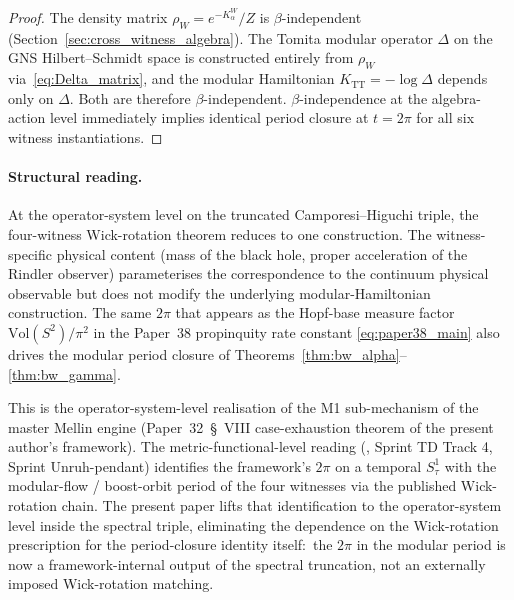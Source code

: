 \documentclass[11pt,a4paper]{article}
\theoremstyle{plain}
\theoremstyle{definition}
\newcommand{\Vol}{\mathrm{Vol}}
\newcommand{\TT}{\mathrm{TT}}
\begin{document}
\begin{proof}
The density matrix $\rho_W = e^{-K_\alpha^W}/Z$ is
$\beta$-independent (Section~\ref{sec:cross_witness_algebra}). The
Tomita modular operator $\Delta$ on the GNS Hilbert--Schmidt space is
constructed entirely from $\rho_W$ via~\eqref{eq:Delta_matrix},
and the modular Hamiltonian $K_{\TT} = -\log \Delta$ depends only on
$\Delta$. Both are therefore $\beta$-independent.
$\beta$-independence at the algebra-action level immediately implies
identical period closure at $t = 2\pi$ for all six witness
instantiations.
\end{proof}

\paragraph{Structural reading.}
At the operator-system level on the truncated Camporesi--Higuchi
triple, the four-witness Wick-rotation theorem reduces to one
construction. The witness-specific physical content (mass of the black
hole, proper acceleration of the Rindler observer) parameterises the
correspondence to the continuum physical observable but does not
modify the underlying modular-Hamiltonian construction. The same
$2\pi$ that appears as the Hopf-base measure factor $\Vol(S^2)/\pi^2$
in the Paper~38 propinquity rate constant
\eqref{eq:paper38_main} also drives the modular period closure of
Theorems~\ref{thm:bw_alpha}--\ref{thm:bw_gamma}.

This is the operator-system-level realisation of the M1 sub-mechanism
of the master Mellin engine
(Paper~32~\S~VIII case-exhaustion theorem of the present author's
framework). The metric-functional-level reading
(\cite[Rem.~rem:bisognano\_wichmann\_reading]{paper32}, Sprint TD
Track 4, Sprint Unruh-pendant) identifies the framework's $2\pi$
on a temporal $S^1_\tau$ with the modular-flow / boost-orbit period
of the four witnesses via the published Wick-rotation chain. The
present paper lifts that identification to the operator-system level
inside the spectral triple, eliminating the dependence on the
Wick-rotation prescription for the period-closure identity itself:\
the $2\pi$ in the modular period is now a framework-internal output
of the spectral truncation, not an externally imposed Wick-rotation
matching.
\end{document}
